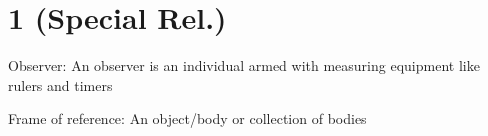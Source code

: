 
	\chapter{1 (Special Rel.)}
	\begin{itemized}
		\item{Observer: An observer is an individual armed with measuring equipment like rulers and timers}
		\item{Frame of reference: An object/body or collection of bodies}
	\end{itemized}

